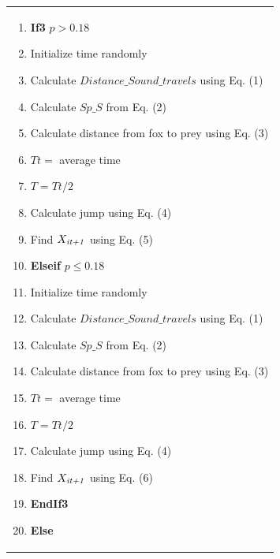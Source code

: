 \documentclass[
]{article}
\begin{document}
\begin{justify}
{\begin{longtable}{@{}p{\dimexpr\linewidth-2\tabcolsep\relax}@{}}
\begin{minipage}[t]{\linewidth}
\begin{enumerate}
  \item \hspace{1cm} \textbf{If3} $p>0.18$ 
  \item \hspace{1.5cm} Initialize time randomly
  \item \hspace{1.5cm} Calculate $Distance\_Sound\_travels$ using Eq. (1)
  \item \hspace{1.5cm} Calculate $Sp\_S$ from Eq. (2)
  \item \hspace{1.5cm} Calculate distance from fox to prey using Eq. (3)
  \item \hspace{1.5cm} $Tt =$ average time
  \item \hspace{1.5cm} $T=Tt/2$
  \item \hspace{1.5cm} Calculate jump using Eq. (4)
  \item \hspace{1.5cm} Find $X_{\text{\textit{it+1}}}$ using Eq. (5)
  \item \hspace{1cm} \textbf{Elseif} $p \leq 0.18$ 
  \item \hspace{1.5cm} Initialize time randomly
  \item \hspace{1.5cm} Calculate $Distance\_Sound\_travels$ using Eq. (1)
  \item \hspace{1.5cm} Calculate $Sp\_S$ from Eq. (2)
  \item \hspace{1.5cm} Calculate distance from fox to prey using Eq. (3) 
  \item \hspace{1.5cm} $Tt =$ average time
  \item \hspace{1.5cm} $T=Tt/2$
  \item \hspace{1.5cm} Calculate jump using Eq. (4)
  \item \hspace{1.5cm} Find $X_{\text{\textit{it+1}}}$ using Eq. (6)
  \item \hspace{1cm} \textbf{EndIf3}
  \item \hspace{0.5cm} \textbf{Else}

\end{enumerate}
\end{minipage}
\end{longtable}}
\end{justify}
\end{document}
